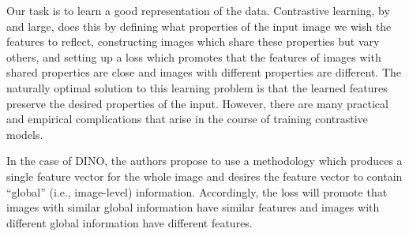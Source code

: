 \documentclass[../../book-main.tex]{subfiles}
\begin{document}
Our task is to learn a good representation of the data. Contrastive
learning, by and large, does this by defining what properties of the
input image we wish the features to reflect, constructing images
which share these properties but vary others, and setting up a loss
which promotes that the features of images with shared properties are
close and images with different properties are different. The
naturally optimal solution to this learning problem is that the
learned features preserve the desired properties of the input.
However, there are many practical and empirical complications that
arise in the course of training contrastive models.

In the case of DINO, the authors propose to use a methodology which
produces a single feature vector for the whole image and desires the
feature vector to contain ``global'' (i.e., image-level) information.
Accordingly, the loss will promote that images with similar global
information have similar features and images with different global
information have different features.
\end{document}
